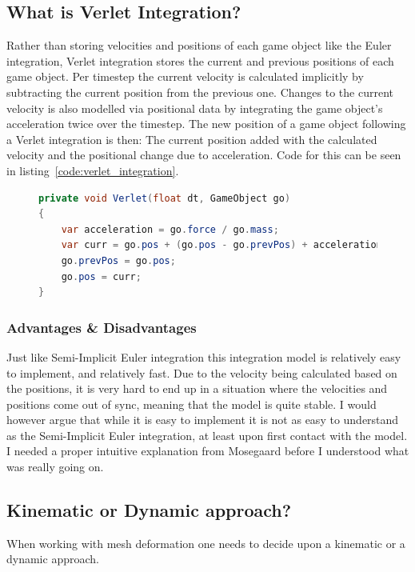 \subsection{What is Verlet Integration?}
Rather than storing velocities and positions of each game object like the Euler integration, Verlet integration stores the current and previous positions of each game object.
Per timestep the current velocity is calculated implicitly by subtracting the current position from the previous one.
Changes to the current velocity is also modelled via positional data by integrating the game object's acceleration twice over the timestep.
The new position of a game object following a Verlet integration is then: The current position added with the calculated velocity and the positional change due to acceleration.
Code for this can be seen in listing~\ref{code:verlet_integration}.

\begin{figure}
\begin{lstlisting}[label={code:verlet_integration},language=csharp,caption={Verlet Integration}]
private void Verlet(float dt, GameObject go)
{
    var acceleration = go.force / go.mass;
    var curr = go.pos + (go.pos - go.prevPos) + acceleration * dt * dt;
    go.prevPos = go.pos;
    go.pos = curr;
}
\end{lstlisting}
\end{figure}

\subsubsection{Advantages \& Disadvantages}
Just like Semi-Implicit Euler integration this integration model is relatively easy to implement, and relatively fast.
Due to the velocity being calculated based on the positions, it is very hard to end up in a situation where the velocities and positions come out of sync,
meaning that the model is quite stable.
I would however argue that while it is easy to implement it is not as easy to understand as the Semi-Implicit Euler integration, at least upon first contact with the model.
I needed a proper intuitive explanation from Mosegaard\cite{mosegaards_clothing_simulation} before I understood what was really going on.

\subsection{Kinematic or Dynamic approach?}
When working with mesh deformation one needs to decide upon a kinematic or a dynamic approach.

